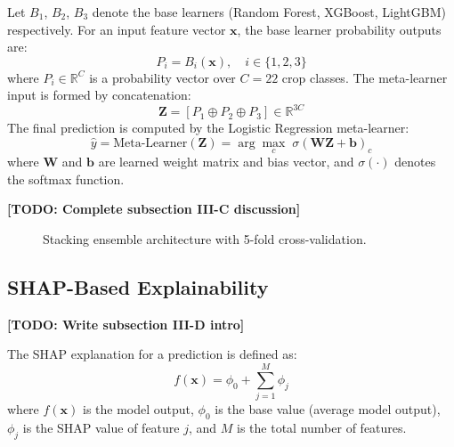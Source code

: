 \documentclass[conference]{IEEEtran}
\begin{document}
Let $B_1$, $B_2$, $B_3$ denote the base learners (Random Forest, XGBoost, LightGBM) respectively. For an input feature vector $\mathbf{x}$, the base learner probability outputs are:
\begin{equation}
    P_i = B_i(\mathbf{x}), \quad i \in \{1, 2, 3\}
    \label{eq:base_predictions}
\end{equation}
where $P_i \in \mathbb{R}^{C}$ is a probability vector over $C = 22$ crop classes. The meta-learner input is formed by concatenation:
\begin{equation}
    \mathbf{Z} = [P_1 \oplus P_2 \oplus P_3] \in \mathbb{R}^{3C}
    \label{eq:meta_input}
\end{equation}
The final prediction is computed by the Logistic Regression meta-learner:
\begin{equation}
    \hat{y} = \text{Meta-Learner}(\mathbf{Z}) = \arg\max_{c} \; \sigma(\mathbf{W}\mathbf{Z} + \mathbf{b})_c
    \label{eq:final_pred}
\end{equation}
where $\mathbf{W}$ and $\mathbf{b}$ are learned weight matrix and bias vector, and $\sigma(\cdot)$ denotes the softmax function.

\textbf{[TODO: Complete subsection III-C discussion]}

\begin{figure}[htbp]
    \centering
    \caption{Stacking ensemble architecture with 5-fold cross-validation.}
    \label{fig:stacking}
\end{figure}

\subsection{SHAP-Based Explainability}
\textbf{[TODO: Write subsection III-D intro]}

The SHAP explanation for a prediction is defined as:
\begin{equation}
    f(\mathbf{x}) = \phi_0 + \sum_{j=1}^{M} \phi_j
    \label{eq:shap}
\end{equation}
where $f(\mathbf{x})$ is the model output, $\phi_0$ is the base value (average model output), $\phi_j$ is the SHAP value of feature $j$, and $M$ is the total number of features.
\end{document}
